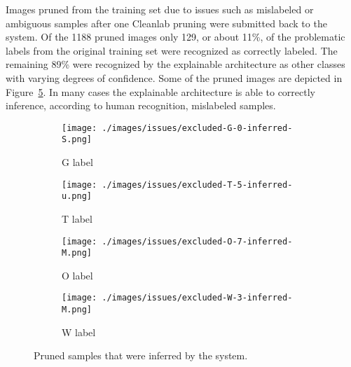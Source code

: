 Images pruned from the training set due to issues such as mislabeled or
ambiguous samples after one Cleanlab pruning were submitted back to the system.  
Of the 1188 pruned images only 129, or about 11\%, of the problematic labels from
the original training set were recognized as correctly labeled.  The remaining
89\% were recognized by the explainable architecture as other classes with
varying degrees of confidence. Some of the pruned images are depicted in
Figure~\ref{fig:pruned_inf_samples}.  In many cases the explainable architecture is
able to correctly inference, according to human recognition, mislabeled samples.

\begin{figure}[H]
    \centering
    \begin{subfigure}{.20\columnwidth}
        \centering
        \texttt{[image: ./images/issues/excluded-G-0-inferred-S.png]}
        \caption{G label}
        \label{fig:inf_issue_G0}
    \end{subfigure}%
    \begin{subfigure}{.20\columnwidth}
        \centering
        \texttt{[image: ./images/issues/excluded-T-5-inferred-u.png]}
        \caption{T label}
        \label{fig:inf_issue_T5}
    \end{subfigure}%
    \begin{subfigure}{.20\columnwidth}
        \centering
        \texttt{[image: ./images/issues/excluded-O-7-inferred-M.png]}
        \caption{O label}
        \label{fig:inf_issue_O7}
    \end{subfigure}%
    \begin{subfigure}{.20\columnwidth}
        \centering
        \texttt{[image: ./images/issues/excluded-W-3-inferred-M.png]}
        \caption{W label}
        \label{fig:inf_issue_W3}
    \end{subfigure}%
    \caption{Pruned samples that were inferred by the system.}
    \label{fig:pruned_inf_samples}
\end{figure}

